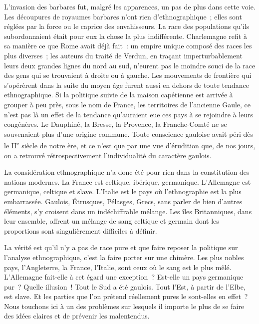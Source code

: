\documentclass[twoside]{book} %
\newcommand\orgName[1]{#1}
\newcommand\persName[1]{#1}
\newcommand\placeName[1]{#1}
\begin{document}
L’invasion des {\orgName barbares} fut, malgré les apparences, un pas de plus dans cette voie. Les découpures de {\placeName royaumes barbares} n’ont rien d’ethnographique ; elles sont réglées par la force ou le caprice des envahisseurs. La race des populations qu’ils subordonnaient était pour eux la chose la plus indifférente. {\persName Charlemagne} refit à sa manière ce que {\orgName Rome} avait déjà fait : un empire unique composé des races les plus diverses ; les auteurs du traité de Verdun, en traçant imperturbablement leurs deux grandes lignes du nord au sud, n’eurent pas le moindre souci de la race des gens qui se trouvaient à droite ou à gauche. Les mouvements de frontière qui s’opérèrent dans la suite du moyen âge furent aussi en dehors de toute tendance ethnographique. Si la politique suivie de la maison capétienne est arrivée à grouper à peu près, sous le nom de {\placeName France}, les territoires de l’ancienne {\placeName Gaule}, ce n’est pas là un effet de la tendance qu’auraient eue ces pays à se rejoindre à leurs congénères. Le {\placeName Dauphiné}, la {\placeName Bresse}, la {\placeName Provence}, la {\placeName Franche-Comté} ne se souvenaient plus d’une origine commune. Toute conscience gauloise avait péri dès le II\textsuperscript{e} siècle de notre ère, et ce n’est que par une vue d’érudition que, de nos jours, on a retrouvé rétrospectivement l’individualité du caractère gaulois.\par
La considération ethnographique n’a donc été pour rien dans la constitution des nations modernes. La {\orgName France} est celtique, ibérique, germanique. L’{\orgName Allemagne} est germanique, celtique et slave. L’{\orgName Italie} est le pays où l’ethnographie est la plus embarrassée. {\orgName Gaulois}, {\orgName Étrusques}, {\orgName Pélasges}, {\orgName Grecs}, sans parler de bien d’autres éléments, s’y croisent dans un indéchiffrable mélange. Les {\orgName îles Britanniques}, dans leur ensemble, offrent un mélange de sang celtique et germain dont les proportions sont singulièrement difficiles à définir.\par
La vérité est qu’il n’y a pas de race pure et que faire reposer la politique sur l’analyse ethnographique, c’est la faire porter sur une chimère. Les plus nobles pays, l’{\placeName Angleterre}, la {\placeName France}, l’{\placeName Italie}, sont ceux où le sang est le plus mêlé. L’{\placeName Allemagne} fait-elle à cet égard une exception ? Est-elle un pays germanique pur ? Quelle illusion ! Tout le {\placeName Sud} a été gaulois. Tout l’{\placeName Est}, à partir de l’{\placeName Elbe}, est slave. Et les parties que l’on prétend réellement pures le sont-elles en effet ? Nous touchons ici à un des problèmes sur lesquels il importe le plus de se faire des idées claires et de prévenir les malentendus.\par
\end{document}
